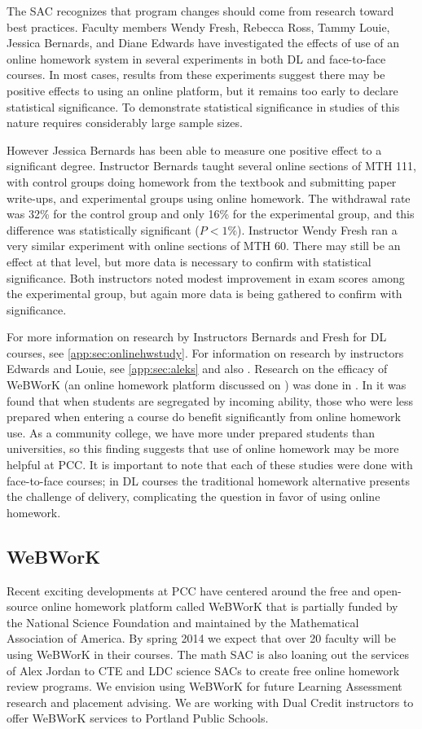 The SAC recognizes that program changes should come from research toward best
practices.  Faculty members Wendy Fresh, Rebecca Ross, Tammy Louie, Jessica
Bernards, and Diane Edwards have investigated the effects of use of an online
homework system in several experiments in both DL and face-to-face courses. In most
cases, results from these experiments suggest there may be positive effects to
using an online platform, but it remains too early to declare statistical
significance. To demonstrate statistical significance in studies of this nature
requires considerably large sample sizes. 

However Jessica Bernards has been able to measure one positive effect to a
significant degree. Instructor Bernards taught several online sections of MTH
111, with control groups doing homework from the textbook and submitting paper
write-ups, and experimental groups using online homework. The withdrawal rate
was 32\% for the control group and only 16\% for the experimental group, and
this difference was statistically significant ($P<1\%$).  Instructor Wendy Fresh
ran a very similar experiment with online sections of MTH 60. There may still be
an effect at that level, but more data is necessary to confirm with statistical
significance. Both instructors noted modest improvement in exam scores among the
experimental group, but again more data is being gathered to confirm with
significance.

For more information on research by Instructors Bernards and Fresh for DL
courses, see \vref{app:sec:onlinehwstudy}. For information on research by
instructors Edwards and Louie, see \vref{app:sec:aleks} and also
. Research on the efficacy of WeBWorK (an online
homework platform discussed on ) was done in
\cite{focuswebwork}.  In \cite{brewer} it was found that when students are
segregated by incoming ability, those who were less prepared when entering a
course do benefit significantly from online homework use. As a community
college, we have more under prepared students than universities, so this
finding suggests that use of online homework may be more helpful at PCC. It is
important to note that each of these studies were done with face-to-face
courses; in DL courses the traditional homework alternative presents the
challenge of delivery, complicating the question in favor of using online
homework.

\subsection{WeBWorK}\label{other:sec:webwork}
Recent exciting developments at PCC have centered around the free and
open-source online homework platform called WeBWorK that is partially funded by
the National Science Foundation and maintained by the Mathematical Association
of America. By spring 2014 we expect that over 20 faculty will be using WeBWorK
in their courses. The math SAC is also loaning out the services of Alex Jordan
to CTE and LDC science SACs to create free online homework review programs. We
envision using WeBWorK for future Learning Assessment research and placement
advising. We are working with Dual Credit instructors to offer WeBWorK services
to Portland Public Schools.

